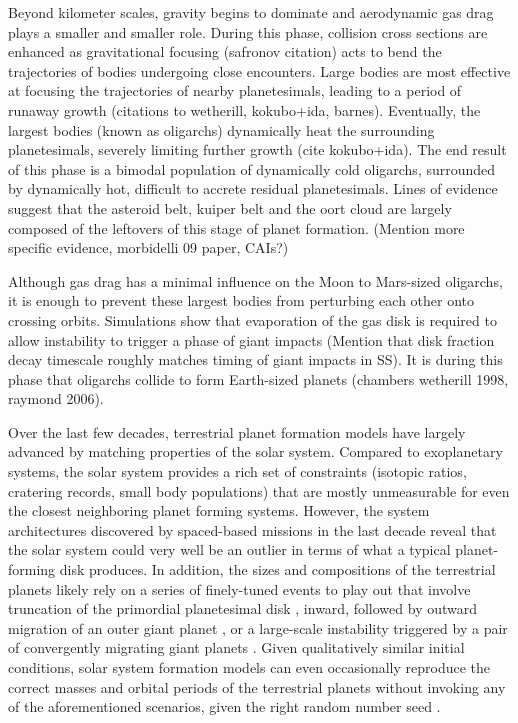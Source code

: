 \documentclass[onecolumn]{aastex63}
\begin{document}
Beyond kilometer scales, gravity begins to dominate and aerodynamic gas drag plays a smaller and smaller role. During this phase, collision cross sections are enhanced as gravitational focusing (safronov citation) acts to bend the trajectories of bodies undergoing close encounters. Large bodies are most effective at focusing the trajectories of nearby planetesimals, leading to a period of runaway growth (citations to wetherill, kokubo+ida, barnes). Eventually, the largest bodies (known as oligarchs) dynamically heat the surrounding planetesimals, severely limiting further growth (cite kokubo+ida). The end result of this phase is a bimodal population of dynamically cold oligarchs, surrounded by dynamically hot, difficult to accrete residual planetesimals. Lines of evidence suggest that the asteroid belt, kuiper belt and the oort cloud are largely composed of the leftovers of this stage of planet formation. (Mention more specific evidence, morbidelli 09 paper, CAIs?)

Although gas drag has a minimal influence on the Moon to Mars-sized oligarchs, it is enough to prevent these largest bodies from perturbing each other onto crossing orbits. Simulations show that evaporation of the gas disk is required to allow instability to trigger a phase of giant impacts (Mention that disk fraction decay timescale roughly matches timing of giant impacts in SS). It is during this phase that oligarchs collide to form Earth-sized planets (chambers wetherill 1998, raymond 2006).

Over the last few decades, terrestrial planet formation models have largely advanced by matching properties of the solar system. Compared to exoplanetary systems, the solar system provides a rich set of constraints (isotopic ratios, cratering records, small body populations) that are mostly unmeasurable for even the closest neighboring planet forming systems. However, the system architectures discovered by spaced-based missions in the last decade reveal that the solar system could very well be an outlier in terms of what a typical planet-forming disk produces. In addition, the sizes and compositions of the terrestrial planets likely rely on a series of finely-tuned events to play out that involve truncation of the primordial planetesimal disk \citep{raymond17}, inward, followed by outward migration of an outer giant planet \citep{walsh11}, or a large-scale instability triggered by a pair of convergently migrating giant planets \citep{tsiganis05, levison11, nesvorny11}. Given qualitatively similar initial conditions, solar system formation models can even occasionally reproduce the correct masses and orbital periods of the terrestrial planets without invoking any of the aforementioned scenarios, given the right random number seed \citep{fischer14}.
\end{document}
